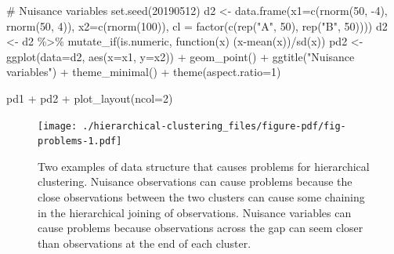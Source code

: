 \documentclass[
  letterpaper,
]{book}
\newenvironment{Shaded}{\begin{snugshade}}{\end{snugshade}}
\newcommand{\AttributeTok}[1]{\textcolor[rgb]{0.40,0.45,0.13}{#1}}
\newcommand{\CommentTok}[1]{\textcolor[rgb]{0.37,0.37,0.37}{#1}}
\newcommand{\ControlFlowTok}[1]{\textcolor[rgb]{0.00,0.23,0.31}{#1}}
\newcommand{\DecValTok}[1]{\textcolor[rgb]{0.68,0.00,0.00}{#1}}
\newcommand{\FunctionTok}[1]{\textcolor[rgb]{0.28,0.35,0.67}{#1}}
\newcommand{\NormalTok}[1]{\textcolor[rgb]{0.00,0.23,0.31}{#1}}
\newcommand{\OtherTok}[1]{\textcolor[rgb]{0.00,0.23,0.31}{#1}}
\newcommand{\SpecialCharTok}[1]{\textcolor[rgb]{0.37,0.37,0.37}{#1}}
\newcommand{\StringTok}[1]{\textcolor[rgb]{0.13,0.47,0.30}{#1}}
\begin{document}
\begin{Shaded}
\begin{Highlighting}[]
\CommentTok{\# Nuisance variables}
\FunctionTok{set.seed}\NormalTok{(}\DecValTok{20190512}\NormalTok{)}
\NormalTok{d2 }\OtherTok{\textless{}{-}} \FunctionTok{data.frame}\NormalTok{(}\AttributeTok{x1=}\FunctionTok{c}\NormalTok{(}\FunctionTok{rnorm}\NormalTok{(}\DecValTok{50}\NormalTok{, }\SpecialCharTok{{-}}\DecValTok{4}\NormalTok{), }
                            \FunctionTok{rnorm}\NormalTok{(}\DecValTok{50}\NormalTok{, }\DecValTok{4}\NormalTok{)),}
                 \AttributeTok{x2=}\FunctionTok{c}\NormalTok{(}\FunctionTok{rnorm}\NormalTok{(}\DecValTok{100}\NormalTok{)),}
                 \AttributeTok{cl =} \FunctionTok{factor}\NormalTok{(}\FunctionTok{c}\NormalTok{(}\FunctionTok{rep}\NormalTok{(}\StringTok{"A"}\NormalTok{, }\DecValTok{50}\NormalTok{), }
                             \FunctionTok{rep}\NormalTok{(}\StringTok{"B"}\NormalTok{, }\DecValTok{50}\NormalTok{))))}
\NormalTok{d2 }\OtherTok{\textless{}{-}}\NormalTok{ d2 }\SpecialCharTok{\%\textgreater{}\%} 
  \FunctionTok{mutate\_if}\NormalTok{(is.numeric, }\ControlFlowTok{function}\NormalTok{(x) (x}\SpecialCharTok{{-}}\FunctionTok{mean}\NormalTok{(x))}\SpecialCharTok{/}\FunctionTok{sd}\NormalTok{(x))}
\NormalTok{pd2 }\OtherTok{\textless{}{-}} \FunctionTok{ggplot}\NormalTok{(}\AttributeTok{data=}\NormalTok{d2, }\FunctionTok{aes}\NormalTok{(}\AttributeTok{x=}\NormalTok{x1, }\AttributeTok{y=}\NormalTok{x2)) }\SpecialCharTok{+} 
  \FunctionTok{geom\_point}\NormalTok{() }\SpecialCharTok{+}
    \FunctionTok{ggtitle}\NormalTok{(}\StringTok{"Nuisance variables"}\NormalTok{) }\SpecialCharTok{+} 
  \FunctionTok{theme\_minimal}\NormalTok{() }\SpecialCharTok{+}
    \FunctionTok{theme}\NormalTok{(}\AttributeTok{aspect.ratio=}\DecValTok{1}\NormalTok{)}

\NormalTok{pd1 }\SpecialCharTok{+}\NormalTok{ pd2 }\SpecialCharTok{+} \FunctionTok{plot\_layout}\NormalTok{(}\AttributeTok{ncol=}\DecValTok{2}\NormalTok{)}
\end{Highlighting}
\end{Shaded}

\begin{figure}[H]

{\centering \texttt{[image: ./hierarchical-clustering\_files/figure-pdf/fig-problems-1.pdf]}

}

\caption{\label{fig-problems}Two examples of data structure that causes
problems for hierarchical clustering. Nuisance observations can cause
problems because the close observations between the two clusters can
cause some chaining in the hierarchical joining of observations.
Nuisance variables can cause problems because observations across the
gap can seem closer than observations at the end of each cluster.}

\end{figure}
\end{document}
